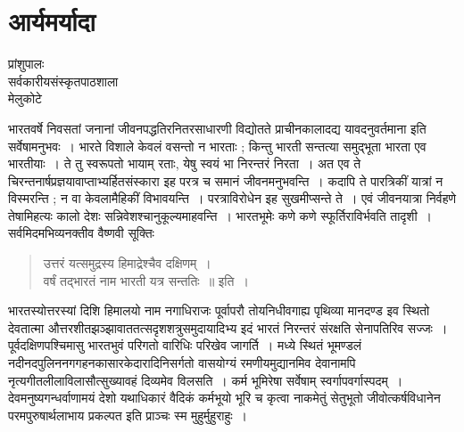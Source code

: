 {\fontsize{15}{17}\selectfont
\presetvalues
\chapter{आर्यमर्यादा}

\begin{center}
\smallskip

प्रांशुपालः\\
सर्वकारीयसंस्कृतपाठशाला\\ मेलुकोटे
\addrule
\end{center}

भारतवर्षे निवसतां जनानां जीवनपद्धतिरनितरसाधारणी विद्योतते प्राचीनकालादद्य यावदनुवर्तमाना इति सर्वेषामनुभवः~। भारते विशाले केवलं वसन्तो न भारताः ; किन्तु भारती सन्तत्या समुद्भूता भारता एव भारतीयाः~। ते तु स्वरूपतो भायाम् रताः, येषु स्वयं भा निरन्तरं निरता~। अत एव ते चिरन्तनार्षप्रज्ञयावाप्ताभ्यर्हितसंस्कारा इह परत्र च समानं जीवनमनुभवन्ति~। कदापि ते पारत्रिकीं यात्रां न विस्मरन्ति ; न वा केवलामैहिकीं विभावयन्ति~। परत्राविरोधेन इह सुखमीप्सन्ते ते~। एवं जीवनयात्रा निर्वहणे तेषामिहत्यः कालो देशः सन्निवेशश्चानुकूल्यमाहवन्ति~। भारतभूमेः कणे कणे स्फूर्तिराविर्भवति तादृशी~। सर्वमिदमभिव्यनक्तीव वैष्णवी सूक्तिः 
\begin{verse}
उत्तरं यत्समुद्रस्य हिमाद्रेश्चैव दक्षिणम्~। \\
वर्षं तद्भारतं नाम भारती यत्र सन्ततिः~॥ इति~। 
\end{verse}
भारतस्योत्तरस्यां दिशि हिमालयो नाम नगाधिराजः पूर्वापरौ तोयनिधीवगाह्य पृथिव्या मानदण्ड इव स्थितो देवतात्मा औत्तरशीतझञ्झावाततत्सदृशशत्रुसमुदायादिभ्य इदं भारतं निरन्तरं संरक्षति सेनापतिरिव सज्जः~। पूर्वदक्षिणपश्चिमासु भारतभुवं परिगतो वारिधिः परिखेव जागर्ति~। मध्ये स्थितं  भूमण्डलं नदीनदपुलिननगगहनकासारकेदारादिनिसर्गतो वासयोग्यं रमणीयमुद्यानमिव देवानामपि नृत्यगीतलीलाविलासौत्सुख्यावहं दिव्यमेव विलसति~। कर्म भूमिरेषा सर्वेषाम् स्वर्गापवर्गास्पदम्~। देवमनुष्यगन्धर्वाणामयं देशो यथाधिकारं वैदिकं कर्मभूयो भूरि च कृत्वा नाकमेतुं सेतुभूतो जीवोत्कर्षविधानेन परमपुरुषार्थलाभाय प्रकल्पत इति प्राञ्चः स्म मुहुर्मुहुराहुः~। 

}
